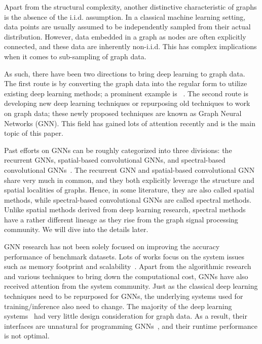 Apart from the structural complexity, another distinctive characteristic of graphs is the absence of the i.i.d. assumption. In a classical machine learning setting, data points are usually assumed to be independently sampled from their actual distribution. However, data embedded in a graph as nodes are often explicitly connected, and these data are inherently non-i.i.d. This has complex implications when it comes to sub-sampling of graph data.

As such, there have been two directions to bring deep learning to graph data. The first route is by converting the graph data into the regular form to utilize existing deep learning methods; a prominent example is ~\cite{deepwalk}. The second route is developing new deep learning techniques or repurposing old techniques to work on graph data; these newly proposed techniques are known as Graph Neural Networks (GNN). This field has gained lots of attention recently and is the main topic of this paper.

Past efforts on GNNs can be roughly categorized into three divisions: the recurrent GNNs, spatial-based convolutional GNNs, and spectral-based convolutional GNNs~\cite{compsurvey}. The recurrent GNN and spatial-based convolutional GNN share very much in common, and they both explicitly leverage the structure and spatial localities of graphs. Hence, in some literature, they are also called spatial methods, while spectral-based convolutional GNNs are called spectral methods. Unlike spatial methods derived from deep learning research, spectral methods have a rather different lineage as they rise from the graph signal processing community. We will dive into the details later.
%

GNN research has not been solely focused on improving the accuracy performance of benchmark datasets. Lots of works focus on the system issues such as memory footprint and scalability~\cite{graphsage, fastgcn}. Apart from the algorithmic research and various techniques to bring down the computational cost, GNNs have also received attention from the system community. Just as the classical deep learning techniques need to be repurposed for GNNs, the underlying systems used for training/inference also need to change. The majority of the deep learning systems~\cite{tf, torch} had very little design consideration for graph data. As a result, their interfaces are unnatural for programming GNNs~\cite{dgl}, and their runtime performance is not optimal. 

